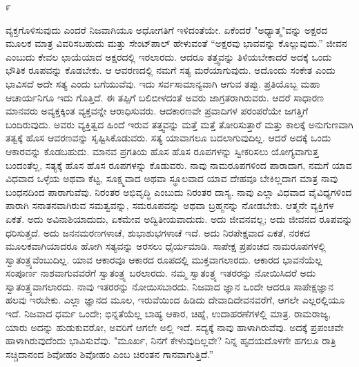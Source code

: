 \begin{center}
೯
\end{center}

ವ್ಯಕ್ತಗೊಳಿಸುವುದು ಎಂದರೆ ನಿಜವಾಗಿಯೂ ಅಧೋಗತಿಗೆ ಇಳಿದಂತೆಯೇ. ಏಕೆಂದರೆ "ಅಧ್ಯಾತ್ಮ"ವನ್ನು ಅಕ್ಷರದ ಮೂಲಕ ಮಾತ್ರ ವಿವರಿಸಬಹುದು ಮತ್ತು ಸೇಂಟ್‌ಪಾಲ್ ಹೇಳುವಂತೆ “ಅಕ್ಷರವು ಭಾವವನ್ನು ಕೊಲ್ಲುವುದು.'' ಜೀವನ ಎಂಬುದು ಕೇವಲ ಛಾಯೆಯಾದ ಅಕ್ಷರದಲ್ಲಿ ಇರಲಾರದು. ಆದರೂ ತತ್ತ್ವವನ್ನು ತಿಳಿಯಬೇಕಾದರೆ ಅದಕ್ಕೆ ಒಂದು ಭೌತಿಕ ರೂಪವನ್ನು ಕೊಡಬೇಕು. ಆ ಆವರಣದಲ್ಲಿ ನಮಗೆ ಸತ್ಯ ಮರೆಯಾಗುವುದು. ಅದೊಂದು ಸಂಕೇತ ಎಂದು ಭಾವಿಸದೆ ಅದೇ ಸತ್ಯ ಎಂದು ಬಗೆಯುವೆವು. ಇದು ಸರ್ವಸಾಮಾನ್ಯವಾಗಿ ಆಗುವ ತಪ್ಪು. ಪ್ರತಿಯೊಬ್ಬ ಮಹಾ ಆಚಾರ್ಯನಿಗೂ ಇದು ಗೊತ್ತಿದೆ. ಈ ತಪ್ಪಿಗೆ ಬಲಿಬೀಳದಂತೆ ಅವರು ಜಾಗ್ರತರಾಗಿರುವರು. ಆದರೆ ಸಾಧಾರಣ ಮಾನವರು ಅವ್ಯಕ್ತಕ್ಕಿಂತ ವ್ಯಕ್ತವನ್ನೇ ಆರಾಧಿಸುವರು. ಆದಕಾರಣವೇ ಪ್ರವಾದಿಗಳ ಪರಂಪರೆಯೇ ಜಗತ್ತಿಗೆ ಬಂದಿರುವುದು. ಅವರು ವ್ಯಕ್ತಿತ್ವದ ಹಿಂದೆ ಇರುವ ತತ್ತ್ವವನ್ನು ಮತ್ತೆ ಮತ್ತೆ ತೋರಿಸುತ್ತಾರೆ ಮತ್ತು ಕಾಲಕ್ಕೆ ಅನುಗುಣವಾಗಿ ತತ್ವಕ್ಕೆ ಹೊಸ ಆವರಣವನ್ನು ಸೃಷ್ಟಿಸಿಕೊಡುವರು. ಸತ್ಯ ಯಾವಾಗಲೂ ಬದಲಾಗುವುದಿಲ್ಲ. ಆದರೆ ಅದಕ್ಕೆ ಒಂದು ಆಕಾರವನ್ನು ಕೊಡಬಹುದು. ಮಾನವ ಪ್ರಗತಿಯ ಹೊಸ ಹೊಸ ರೂಪಗಳನ್ನು ಸ್ವೀಕರಿಸಲು ಯೋಗ್ಯವಾಗುತ್ತ ಬಂದಂತೆಲ್ಲ, ಸತ್ಯಕ್ಕೆ ಹೊಸ ಹೊಸ ರೂಪಗಳನ್ನು ಕೊಡುವರು. ನಾವು ನಾಮರೂಪಗಳಿಂದ ಪಾರಾದಾಗ, ನಮಗೆ ಯಾವ ವಿಧವಾದ ಒಳ್ಳೆಯ ಅಥವಾ ಕೆಟ್ಟ, ಸೂಕ್ಷ್ಮವಾದ ಅಥವಾ ಸ್ಥೂಲವಾದ ಯಾವ ದೇಹವೂ ಬೇಕಿಲ್ಲದಾಗ ಮಾತ್ರ ನಾವು ಬಂಧನದಿಂದ ಪಾರಾಗುವೆವು. ನಿರಂತರ ಅಭಿವೃದ್ಧಿ ಎಂಬುದು ನಿರಂತರ ದಾಸ್ಯ. ನಾವು ಎಲ್ಲಾ ವಿಧವಾದ ವೈವಿಧ್ಯಗಳಿಂದ ಪಾರಾಗಿ ಸನಾತನವಾಗಿರುವ ಸಮತ್ವವನ್ನು, ಸಮರೂಪವನ್ನು ಅಥವಾ ಬ್ರಹ್ಮನನ್ನು ನೋಡಬೇಕು. ಆತ್ಮನೇ ವ್ಯಕ್ತಿಗಳ ಏಕತೆ. ಅದು ಅವಿನಾಶಿಯಾದುದು, ಏಕಮೇವ ಅದ್ವಿತೀಯವಾದುದು. ಅದು ಜೀವನವಲ್ಲ; ಅದು ಜೀವನದ ರೂಪವನ್ನು ಧರಿಸುತ್ತದೆ. ಅದು ಜನನಮರಣಗಳಾಚೆ, ಶುಭಾಶುಭಗಳಾಚೆ ಇದೆ. ಅದು ನಿರಪೇಕ್ಷವಾದ ಏಕತೆ, ನರಕದ ಮೂಲಕವಾಗಿಯಾದರೂ ಹೋಗಿ ಸತ್ಯವನ್ನು ಅರಸಲು ಧೈರ್ಯಮಾಡಿ. ಸಾಪೇಕ್ಷ ಪ್ರಪಂಚದ ನಾಮರೂಪಗಳಲ್ಲಿ ಸ್ವಾತಂತ್ರ್ಯವೆಂಬುದಿಲ್ಲ. ಯಾವ ಆಕಾರವೂ ಆಕಾರದ ರೂಪದಲ್ಲಿ ಮುಕ್ತವಾಗಲಾರದು. ಆಕಾರದ ಭಾವನೆಯೆಲ್ಲ ಸಂಪೂರ್ಣ ನಾಶವಾಗುವವರೆಗೆ ಸ್ವಾತಂತ್ರ್ಯ ಬರಲಾರದು. ನಮ್ಮ ಸ್ವಾತಂತ್ರ್ಯ ಇತರರನ್ನು ನೋಯಿಸಿದರೆ ಅದು ಸ್ವಾತಂತ್ರ್ಯವಾಗಲಾರದು. ನಾವು ಇತರರನ್ನು ನೋಯಿಸಬಾರದು. ನಿಜವಾದ ಜ್ಞಾನ ಒಂದೇ ಆದರೂ ಸಾಪೇಕ್ಷಜ್ಞಾನ ಹಲವು ಇರಬೇಕು. ಎಲ್ಲಾ ಜ್ಞಾನದ ಮೂಲ, ಇರುವೆಯಿಂದ ಹಿಡಿದು ದೇವಾದಿದೇವನವರೆಗೆ, ಆಗಲೇ ಎಲ್ಲರಲ್ಲಿಯೂ ಇದೆ. ನಿಜವಾದ ಧರ್ಮ ಒಂದೇ; ಭಿನ್ನತೆಯೆಲ್ಲ ಬಾಹ್ಯ ಆಕಾರ, ಚಿಹ್ನೆ, ಉದಾಹರಣೆಗಳಲ್ಲಿ ಮಾತ್ರ. ರಾಮರಾಜ್ಯ, ಯಾರು ಅದನ್ನು ಹುಡುಕುವರೋ, ಅವರಿಗೆ ಆಗಲೇ ಅಲ್ಲಿ ಇದೆ. ಸದ್ಯಕ್ಕೆ ನಾವು ಹಾಳಾಗಿರುವೆವು. ಅದಕ್ಕೆ ಪ್ರಪಂಚವೇ ಹಾಳಾಗಿರುವುದೆಂದು ಭಾವಿಸುವೆವು. "ಮೂರ್ಖ, ನಿನಗೆ ಕೇಳುವುದಿಲ್ಲವೇ? ನಿನ್ನ ಹೃದಯದೊಳಗೇ ಹಗಲೂ ರಾತ್ರಿ ಸಚ್ಚಿದಾನಂದ ಶಿವೋಹಂ ಶಿವೋಹಂ ಎಂಬ ಚಿರಂತನ ಗಾನವಾಗುತ್ತಿದೆ.''

